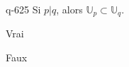 \begin{truefalse}{q-625}
Si $p|q$, alors $\mathbb U_p \subset  \mathbb U_q$.
\item* Vrai
\item Faux
\end{truefalse}

